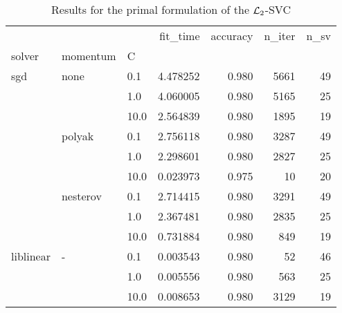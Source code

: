 \begin{table}[H]
\centering
\caption{Results for the primal formulation of the $\protect \mathcal{L}_2$-SVC}
\label{primal_l2_svc_cv_results}
\begin{tabular}{lllrrrr}
\toprule
          &   &      &  fit\_time &  accuracy &  n\_iter &  n\_sv \\
solver & momentum & C &           &           &         &       \\
\midrule
sgd & none & 0.1  &  4.478252 &     0.980 &    5661 &    49 \\
          &   & 1.0  &  4.060005 &     0.980 &    5165 &    25 \\
          &   & 10.0 &  2.564839 &     0.980 &    1895 &    19 \\
          & polyak & 0.1  &  2.756118 &     0.980 &    3287 &    49 \\
          &   & 1.0  &  2.298601 &     0.980 &    2827 &    25 \\
          &   & 10.0 &  0.023973 &     0.975 &      10 &    20 \\
          & nesterov & 0.1  &  2.714415 &     0.980 &    3291 &    49 \\
          &   & 1.0  &  2.367481 &     0.980 &    2835 &    25 \\
          &   & 10.0 &  0.731884 &     0.980 &     849 &    19 \\
liblinear & - & 0.1  &  0.003543 &     0.980 &      52 &    46 \\
          &   & 1.0  &  0.005556 &     0.980 &     563 &    25 \\
          &   & 10.0 &  0.008653 &     0.980 &    3129 &    19 \\
\bottomrule
\end{tabular}
\end{table}
